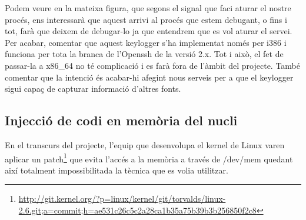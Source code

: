 Podem veure en la mateixa figura, que segons el signal que faci aturar el nostre procés, ens interessarà
que aquest arrivi al procés que estem debugant, o fins i tot, farà que deixem de debugar-lo ja que entendrem
que es vol aturar el servei. \\

Per acabar, comentar que aquest keylogger s'ha implementat només per i386 i funciona per tota la branca 
de l'Openssh de la versió 2.x. Tot i això, el fet de passar-la a x86\_64 no té complicació i es farà fora de 
l'àmbit del projecte. També comentar que la intenció és acabar-hi afegint nous serveis per a que el keylogger
sigui capaç de capturar informació d'altres fonts.

\subsection{Injecció de codi en memòria del nucli}
En el transcurs del projecte, l'equip que desenvolupa el kernel de Linux varen aplicar un 
patch\footnote{\href{Patch que evita l'ús de /dev/mem per accedir a la memòria}{http://git.kernel.org/?p=linux/kernel/git/torvalds/linux-2.6.git;a=commit;h=ae531c26c5c2a28ca1b35a75b39b3b256850f2c8}} que evita
l'accés a la memòria a través de /dev/mem quedant així totalment impossibilitada la tècnica que es volia 
utilitzar. 

